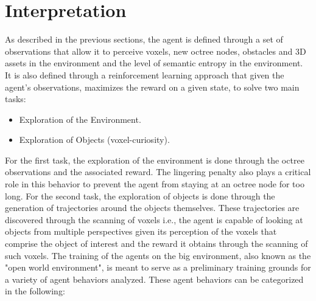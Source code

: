 \section{Interpretation}\label{chap:3:interpretation}

As described in the previous sections, the agent is defined through a set of observations that allow it to perceive voxels, new octree nodes, obstacles and 3D assets in the environment and the level of semantic entropy in the environment. It is also defined through a reinforcement learning approach that given the agent's observations, maximizes the reward on a given state, to solve two main tasks:
\begin{itemize}
    \item Exploration of the Environment.
    \item Exploration of Objects (voxel-curiosity).
\end{itemize}
For the first task, the exploration of the environment is done through the octree observations and the associated reward. The lingering penalty also plays a critical role in this behavior to prevent the agent from staying at an octree node for too long.
For the second task, the exploration of objects is done through the generation of trajectories around the objects themselves. These trajectories are discovered through the scanning of voxels i.e., the agent is capable of looking at objects from multiple perspectives given its perception of the voxels that comprise the object of interest and the reward it obtains through the scanning of such voxels. 
The training of the agents on the big environment, also known as the "open world environment", is meant to serve as a preliminary training grounds for a variety of agent behaviors analyzed. These agent behaviors can be categorized in the following:
